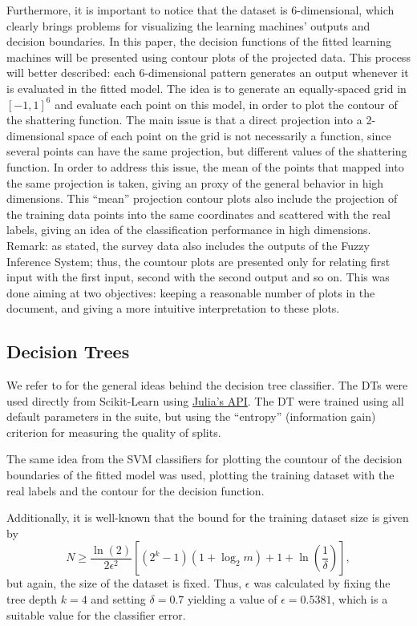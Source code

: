 \documentclass[conference]{IEEEtran}
\theoremstyle{definition}
\theoremstyle{remark}
\theoremstyle{remark}
\begin{document}
Furthermore, it is important to notice that the dataset is 6-dimensional, which
clearly brings problems for visualizing the learning machines' outputs and
decision boundaries. In this paper, the decision functions of the fitted
learning machines will be presented using contour plots of the projected data.
This process will better described: each 6-dimensional pattern generates an
output whenever it is evaluated in the fitted model. The idea is to generate an
equally-spaced grid in $[-1,1]^6$ and evaluate each point on this model, in
order to plot the contour of the shattering function. The main issue is that a
direct projection into a 2-dimensional space of each point on the grid is not
necessarily a function, since several points can have the same projection, but
different values of the shattering function. In order to address this issue,
the mean of the points that mapped into the same projection is taken, giving an
proxy of the general behavior in high dimensions. This ``mean'' projection
contour plots also include the projection of the training data points into the
same coordinates and scattered with the real labels, giving an idea of the
classification performance in high dimensions. Remark: as stated, the survey
data also includes the outputs of the Fuzzy Inference System; thus, the countour
plots are presented only for relating first input with the first input, second
with the second output and so on. This was done aiming at two objectives:
keeping a reasonable number of plots in the document, and giving a more
intuitive interpretation to these plots.

\subsection{Decision Trees}
We refer to \textcite{bramer2007} for the general ideas behind the decision tree
classifier. The DTs were used directly from Scikit-Learn
\parencite{scikit-learn, sklearn_api} using
\href{https://bit.ly/3lDHADX}{Julia's API}. The DT were trained using all
default parameters in the suite, but using the ``entropy'' (information gain)
criterion for measuring the quality of splits.

The same idea from the SVM classifiers for plotting the countour of the decision
boundaries of the fitted model was used, plotting the training dataset with the
real labels and the contour for the decision function.

Additionally, it is well-known that the bound for the training dataset size is
given by
\begin{equation}
  N\geq \dfrac{\ln(2)}{2\epsilon^2}\left[(2^k-1)(1+\log_2 m) + 1 + \ln\left(
  \dfrac{1}{\delta}\right)\right],
\end{equation}
but again, the size of the dataset is fixed. Thus, $\epsilon$ was calculated by
fixing the tree depth $k=4$ and setting $\delta=0.7$ yielding a value of
$\epsilon=0.5381$, which is a suitable value for the classifier error.
\end{document}
